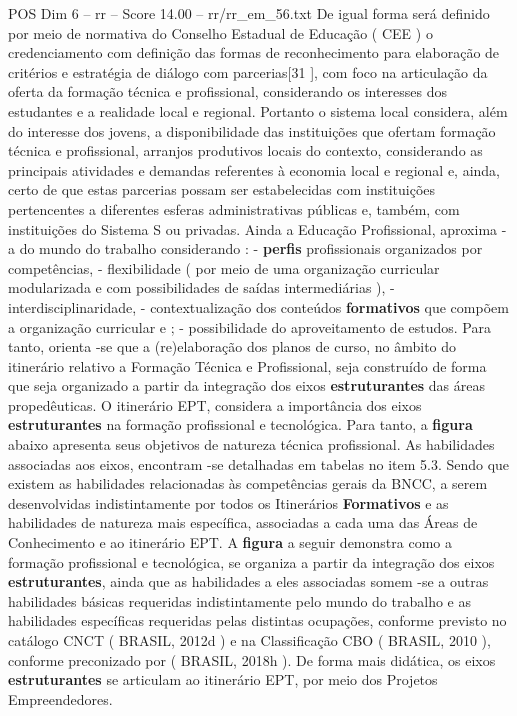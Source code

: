 \begin{textsample}{POS Dim 6 – rr – Score 14.00 – rr/rr\_em\_56.txt}
De igual forma será definido por meio de normativa do Conselho Estadual de Educação ( CEE ) o credenciamento com definição das formas de reconhecimento para elaboração de critérios e estratégia de diálogo com parcerias[31 ], com foco na articulação da oferta da formação técnica e profissional, considerando os interesses dos estudantes e a realidade local e regional.
Portanto o sistema local considera, além do interesse dos jovens, a disponibilidade das instituições que ofertam formação técnica e profissional, arranjos produtivos locais do contexto, considerando as principais atividades e demandas referentes à economia local e regional e, ainda, certo de que estas parcerias possam ser estabelecidas com instituições pertencentes a diferentes esferas administrativas públicas e, também, com instituições do Sistema S ou privadas.
Ainda a Educação Profissional, aproxima -a do mundo do trabalho considerando : - \textbf{perfis} profissionais organizados por competências, - flexibilidade ( por meio de uma organização curricular modularizada e com possibilidades de saídas intermediárias ), - interdisciplinaridade, - contextualização dos conteúdos \textbf{formativos} que compõem a organização curricular e ; - possibilidade do aproveitamento de estudos.
Para tanto, orienta -se que a (re)elaboração dos planos de curso, no âmbito do itinerário relativo a Formação Técnica e Profissional, seja construído de forma que seja organizado a partir da integração dos eixos \textbf{estruturantes} das áreas propedêuticas.
O itinerário EPT, considera a importância dos eixos \textbf{estruturantes} na formação profissional e tecnológica.
Para tanto, a \textbf{figura} abaixo apresenta seus objetivos de natureza técnica profissional.
As habilidades associadas aos eixos, encontram -se detalhadas em tabelas no item 5.3.
Sendo que existem as habilidades relacionadas às competências gerais da BNCC, a serem desenvolvidas indistintamente por todos os Itinerários \textbf{Formativos} e as habilidades de natureza mais específica, associadas a cada uma das Áreas de Conhecimento e ao itinerário EPT.
A \textbf{figura} a seguir demonstra como a formação profissional e tecnológica, se organiza a partir da integração dos eixos \textbf{estruturantes}, ainda que as habilidades a eles associadas somem -se a outras habilidades básicas requeridas indistintamente pelo mundo do trabalho e as habilidades específicas requeridas pelas distintas ocupações, conforme previsto no catálogo CNCT ( BRASIL, 2012d ) e na Classificação CBO ( BRASIL, 2010 ), conforme preconizado por ( BRASIL, 2018h ).
De forma mais didática, os eixos \textbf{estruturantes} se articulam ao itinerário EPT, por meio dos Projetos Empreendedores.

\end{textsample}
